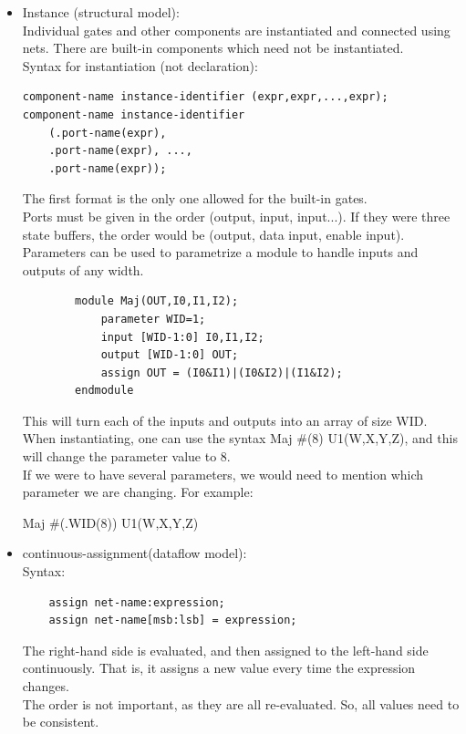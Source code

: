 \documentclass[nobib]{tufte-handout}
\begin{document}
\begin{itemize}
    \item Instance (structural model):\\
    Individual gates and other components are instantiated and connected using nets. There are built-in components which need not be instantiated.\\
    Syntax for instantiation (not declaration):
    \begin{lstlisting}
component-name instance-identifier (expr,expr,...,expr);
component-name instance-identifier
    (.port-name(expr),
    .port-name(expr), ...,
    .port-name(expr));
    \end{lstlisting}
    The first format is the only one allowed for the built-in gates.\\ Ports must be given in the order (output, input, input...). If they were three state buffers, the order would be (output, data input, enable input).\\
    Parameters can be used to parametrize a module to handle inputs and outputs of any width. 
    \begin{lstlisting}
        module Maj(OUT,I0,I1,I2);
            parameter WID=1;
            input [WID-1:0] I0,I1,I2;
            output [WID-1:0] OUT;
            assign OUT = (I0&I1)|(I0&I2)|(I1&I2);
        endmodule
    \end{lstlisting}
    This will turn each of the inputs and outputs into an array of size WID.\\
    When instantiating, one can use the syntax Maj \#(8) U1(W,X,Y,Z), and this will change the parameter value to 8.\\
    If we were to have several parameters, we would need to mention which parameter we are changing. For example:\\
    \begin{center}
        Maj \#(.WID(8)) U1(W,X,Y,Z)
    \end{center}
    \item continuous-assignment(dataflow model):\\
    Syntax:
    \begin{lstlisting}
    assign net-name:expression;
    assign net-name[msb:lsb] = expression;
    \end{lstlisting}
    The right-hand side is evaluated, and then assigned to the left-hand side continuously. That is, it assigns a new value every time the expression changes.\\
    The order is not important, as they are all re-evaluated. So, all values need to be consistent.\\

\end{itemize}
\end{document}
